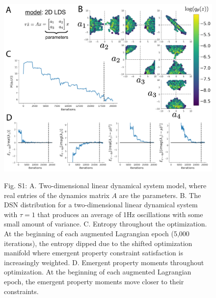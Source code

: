 \documentclass[11pt]{article}
\begin{document}
\begin{figure}
\begin{center}
\includegraphics[scale=0.5]{figures/figS2/figS2.pdf}
\end{center}
\begin{flushleft}
Fig. S1: A. Two-dimensional linear dynamical system model, where real entries of the dynamics matrix $A$ are the parameters.  B. The DSN distribution for a two-dimensional linear dynamical system  with $\tau=1$ that produces an average of 1Hz oscillations with some small amount of variance.  C. Entropy throughout the optimization.  At the beginning of each augmented Lagrangian epoch (5,000 iterations), the entropy dipped due to the shifted optimization manifold where emergent property constraint satisfaction is increasingly weighted.  D. Emergent property moments throughout optimization.  At the beginning of each augmented Lagrangian epoch, the emergent property moments move closer to their constraints.
\end{flushleft}
\end{figure}
\end{document}
